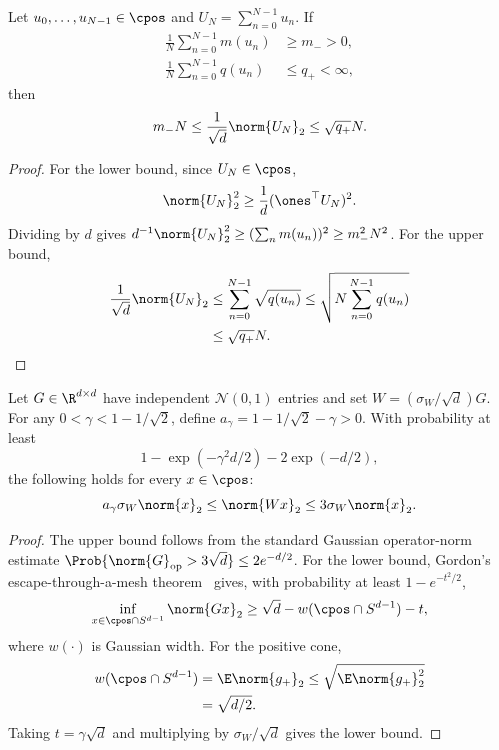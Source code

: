 \begin{lemma}
\label{lem:positive-cone-mass}
Let $u_0,\ldots,u_{N-1}\in\cpos$ and $U_N=\sum_{n=0}^{N-1}u_n$. If
\[
  \begin{aligned}
  \frac{1}{N}\sum_{n=0}^{N-1}m(u_n)&\ge m_->0,\\
  \frac{1}{N}\sum_{n=0}^{N-1}q(u_n)&\le q_+<\infty,
  \end{aligned}
\]
then
\begin{equation}
  m_-N
  \le
  \frac{1}{\sqrt d}\norm{U_N}_2
  \le
  \sqrt{q_+}N.
  \label{eq:app-UN-linear}
\end{equation}
\end{lemma}

\begin{proof}
For the lower bound, since $U_N\in\cpos$,
\[
  \norm{U_N}_2^2
  \ge
  \frac{1}{d}(\ones^\top U_N)^2.
\]
Dividing by $d$ gives $d^{-1}\norm{U_N}_2^2\ge(\sum_n m(u_n))^2\ge m_-^2N^2$. For the upper bound,
\[
  \begin{aligned}
  \frac{1}{\sqrt d}\norm{U_N}_2
  &\le
  \sum_{n=0}^{N-1}\sqrt{q(u_n)}
  \le
  \sqrt{N\sum_{n=0}^{N-1}q(u_n)}
  \\
  &\le
  \sqrt{q_+}N.
  \end{aligned}
\]
\end{proof}

\begin{lemma}
\label{lem:cone-gain}
Let $G\in\R^{d\times d}$ have independent $\mathcal N(0,1)$ entries and set $W=(\sigma_W/\sqrt d)G$. For any $0<\gamma<1-1/\sqrt2$, define $a_\gamma=1-1/\sqrt2-\gamma>0$. With probability at least
\[
  1-\exp(-\gamma^2d/2)-2\exp(-d/2),
\]
the following holds for every $x\in\cpos$:
\begin{equation}
  a_\gamma\sigma_W\norm{x}_2
  \le
  \norm{Wx}_2
  \le
  3\sigma_W\norm{x}_2.
  \label{eq:app-cone-gain}
\end{equation}
\end{lemma}

\begin{proof}
The upper bound follows from the standard Gaussian operator-norm estimate
$\Prob\{\norm{G}_{\mathrm{op}}>3\sqrt d\}\le 2e^{-d/2}$. For the lower bound, Gordon's escape-through-a-mesh theorem~\citep{gordon1988milman} gives, with probability at least $1-e^{-t^2/2}$,
\[
  \inf_{x\in\cpos\cap S^{d-1}}\norm{Gx}_2
  \ge
  \sqrt d-w(\cpos\cap S^{d-1})-t,
\]
where $w(\cdot)$ is Gaussian width. For the positive cone,
\[
  \begin{aligned}
  w(\cpos\cap S^{d-1})
  &=
  \E\norm{g_+}_2
  \le
  \sqrt{\E\norm{g_+}_2^2}
  \\
  &=
  \sqrt{d/2}.
  \end{aligned}
\]
Taking $t=\gamma\sqrt d$ and multiplying by $\sigma_W/\sqrt d$ gives the lower bound.
\end{proof}

